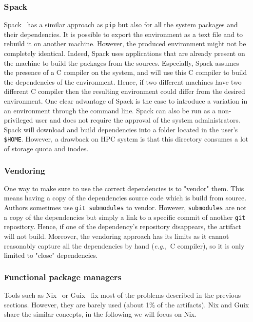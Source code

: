 \documentclass[sigconf,natbib=false]{acmart}
\newcommand{\eg}{\emph{e.g.,}}
\begin{document}
\subsubsection{Spack}

Spack\ \cite{gamblin_spack_2015} has a similar approach as \texttt{pip} but also for all the system packages and their dependencies.
It is possible to export the environment as a text file and to rebuild it on another machine.
However, the produced environment might not be completely identical.
Indeed, Spack uses applications that are already present on the machine to build the packages from the sources.
Especially, Spack assumes the presence of a C compiler on the system, and will use this C compiler to build the dependencies of the environment.
Hence, if two different machines have two different C compiler then the resulting environment could differ from the desired environment.
One clear advantage of Spack is the ease to introduce a variation in an environment through the command line.
Spack can also be run as a non-privileged user and does not require the approval of the system administrators.
Spack will download and build dependencies into a folder located in the user's \texttt{\$HOME}.
However, a drawback on HPC system is that this directory consumes a lot of storage quota and inodes.

\subsubsection{Vendoring}

One way to make sure to use the correct dependencies is to "vendor" them.
This means having a copy of the dependencies source code which is build from source.
Authors sometimes use \texttt{git submodules} to vendor.
However, \texttt{submodules} are not a copy of the dependencies but simply a link to a specific commit of another \texttt{git} repository.
Hence, if one of the dependency's repository disappears, the artifact will not build.
Moreover, the vendoring approach has its limits as it cannot reasonably capture all the dependencies by hand (\eg\ C compiler), so it is only limited to "close" dependencies.

\subsubsection{Functional package managers}

Tools such as Nix\ \cite{dolstra_nix_2004} or Guix\ \cite{courtes_functional_2013} fix most of the problems described in the previous sections.
However, they are barely used (about 1\% of the artifacts).
Nix and Guix share the similar concepts, in the following we will focus on Nix.
\end{document}
